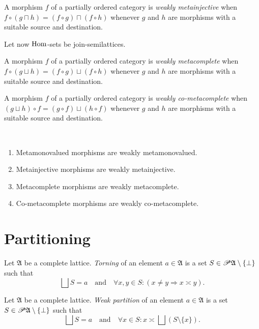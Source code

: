 \begin{defn}
A morphism $f$ of a partially
ordered category is \emph{weakly metainjective} when $f\circ(g\sqcap h)=(f\circ g)\sqcap(f\circ h)$
whenever $g$ and $h$ are morphisms with a suitable source and destination.
\end{defn}
Let now $\operatorname{Hom}$-sets be join-semilattices.
\begin{defn}
A morphism $f$ of a partially
ordered category is \emph{weakly metacomplete} when $f\circ(g\sqcup h)=(f\circ g)\sqcup(f\circ h)$
whenever $g$ and $h$ are morphisms with a suitable source and destination.
\end{defn}

\begin{defn}
A morphism $f$ of a partially
ordered category is \emph{weakly co-metacomplete} when $(g\sqcup h)\circ f=(g\circ f)\sqcup(h\circ f)$
whenever $g$ and $h$ are morphisms with a suitable source and destination.\end{defn}
\begin{obvious}
~
\begin{enumerate}
\item Metamonovalued morphisms are weakly metamonovalued.
\item Metainjective morphisms are weakly metainjective.
\item Metacomplete morphisms are weakly metacomplete.
\item Co-metacomplete morphisms are weakly co-metacomplete.
\end{enumerate}
\end{obvious}

\section{Partitioning}
\begin{defn}
Let $\mathfrak{A}$ be a complete lattice. \emph{Torning}
of an element $a\in\mathfrak{A}$ is a set $S\in\mathscr{P}\mathfrak{A}\setminus\{\bot\}$
such that
\[
\bigsqcup S=a\quad\text{and}\quad\forall x,y\in S:(x\neq y\Rightarrow x\asymp y).
\]

\end{defn}

\begin{defn}
Let $\mathfrak{A}$ be a complete lattice.
\emph{Weak partition} of an element $a\in\mathfrak{A}$ is a set $S\in\mathscr{P}\mathfrak{A}\setminus\{\bot\}$
such that
\[
\bigsqcup S=a\quad\text{and}\quad\forall x\in S:x\asymp\bigsqcup(S\setminus\{x\}).
\]

\end{defn}

